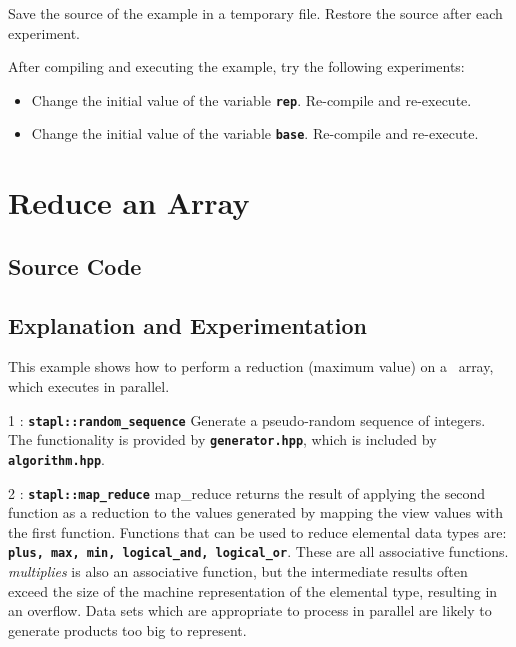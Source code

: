 \documentclass{report}
\begin{document}
Save the source of the example in a temporary file.
Restore the source after each experiment.

After compiling and executing the example, try the following experiments:
\begin{itemize}
\item
Change the initial value of the variable
\texttt{{\bf rep}}.
Re-compile and re-execute.
\item
Change the initial value of the variable
\texttt{{\bf base}}.
Re-compile and re-execute.
\end{itemize}


\pagebreak
\section{Reduce an Array}

\subsection{Source Code}



\subsection{Explanation and Experimentation}

This example shows how to perform a reduction (maximum value)
on a \stapl\ array, which executes in parallel.

\begin{hashitemize}
\item 1 : \texttt{{\bf stapl::random\_sequence}}
\newline
Generate a pseudo-random sequence of integers.
The functionality is provided by
\texttt{{\bf generator.hpp}},
which is included by
\texttt{{\bf algorithm.hpp}}.

\item 2 : \texttt{{\bf stapl::map\_reduce}}
\newline
map\_reduce returns the result of applying the second function as a reduction
to the values generated by mapping the view values with the first function.
Functions that can be used to reduce elemental data types are:
\texttt{{\bf plus, max, min, logical\_and, logical\_or}}.
These are all associative functions.
\emph{multiplies} is also an associative function, but the intermediate
results often exceed the size of the machine representation of the
elemental type, resulting in an overflow.  Data sets which are
appropriate to process in parallel are likely to generate products too
big to represent.
\end{hashitemize}
\end{document}
